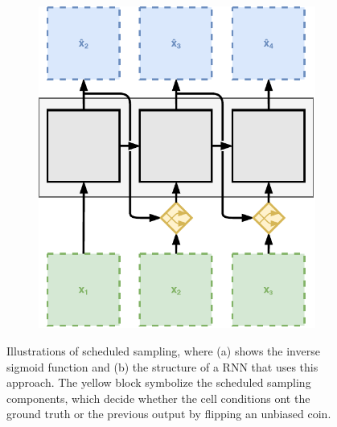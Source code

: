 \begin{figure}[htpb]
\centering
\begin{subfigure}{0.5\textwidth}
  \centering
  \caption{}
  \label{fig:sched-sample-inv-sig}
\end{subfigure}%
\begin{subfigure}{0.5\textwidth}
  \centering
  \includegraphics[width=.8\linewidth]{figures/sched_sample.pdf}
  \caption{}
  \label{fig:sched-sample-process}
\end{subfigure}
\caption[Scheduled Sampling]{Illustrations of scheduled sampling, where (a) shows the inverse sigmoid function and (b) the structure of a RNN that uses this approach. The yellow block symbolize the scheduled sampling components, which decide whether the cell conditions ont the ground truth or the previous output by flipping an unbiased coin.} \label{fig:sched-sample}
\end{figure}




